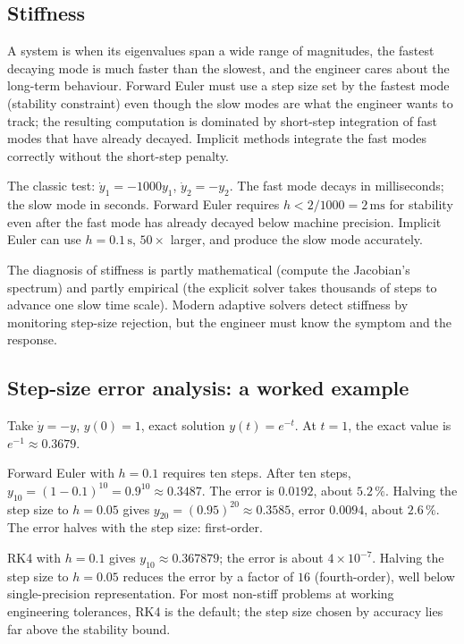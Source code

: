 \subsection{Stiffness}

A system is  when its eigenvalues span a wide range
of magnitudes, the fastest decaying mode is much faster than the
slowest, and the engineer cares about the long-term behaviour.
Forward Euler must use a step size set by the fastest mode
(stability constraint) even though the slow modes are what the
engineer wants to track; the resulting computation is dominated by
short-step integration of fast modes that have already decayed.
Implicit methods integrate the fast modes correctly without the
short-step penalty.

The classic test: $\dot{y}_{1} = -1000 y_{1}$, $\dot{y}_{2} =
-y_{2}$. The fast mode decays in milliseconds; the slow mode in
seconds. Forward Euler requires $h < 2/1000 = 2\,\si{\milli\second}$
for stability even after the fast mode has already decayed below
machine precision. Implicit Euler can use $h = 0.1\,\si{\second}$,
$50\times$ larger, and produce the slow mode accurately.



The diagnosis of stiffness is partly mathematical (compute the
Jacobian's spectrum) and partly empirical (the explicit solver
takes thousands of steps to advance one slow time scale). Modern
adaptive solvers detect stiffness by monitoring step-size
rejection, but the engineer must know the symptom and the response.

\subsection{Step-size error analysis: a worked example}

Take $\dot{y} = -y$, $y(0) = 1$, exact solution $y(t) = e^{-t}$.
At $t = 1$, the exact value is $e^{-1} \approx 0.3679$.

Forward Euler with $h = 0.1$ requires ten steps. After ten steps,
$y_{10} = (1 - 0.1)^{10} = 0.9^{10} \approx 0.3487$. The error is
$0.0192$, about $5.2\,\%$. Halving the step size to $h = 0.05$
gives $y_{20} = (0.95)^{20} \approx 0.3585$, error $0.0094$,
about $2.6\,\%$. The error halves with the step size: first-order.

RK4 with $h = 0.1$ gives $y_{10} \approx 0.367879$; the error is
about $4 \times 10^{-7}$. Halving the step size to $h = 0.05$
reduces the error by a factor of $16$ (fourth-order), well below
single-precision representation. For most non-stiff problems at
working engineering tolerances, RK4 is the default; the step size
chosen by accuracy lies far above the stability bound.

